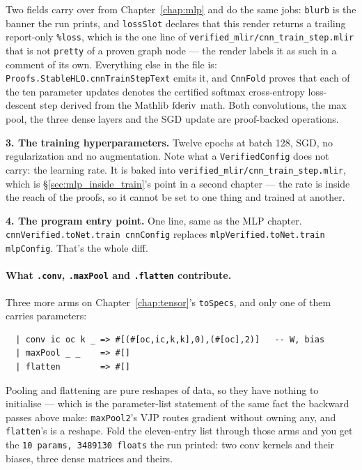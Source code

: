 \noindent Two fields carry over from Chapter~\ref{chap:mlp} and do the same
jobs: \texttt{blurb} is the banner the run prints, and \texttt{lossSlot}
declares that this render returns a trailing report-only \texttt{\%loss},
which is the one line of \texttt{verified\_mlir/cnn\_train\_step.mlir} that
is not \texttt{pretty} of a proven graph node --- the render labels it as
such in a comment of its own. Everything else in the file is:
\texttt{Proofs.StableHLO.cnnTrainStepText} emits it, and
\texttt{CnnFold} proves that each of the ten parameter updates
denotes the certified softmax cross-entropy loss-descent step derived from
the Mathlib \(\operatorname{fderiv}\) math. Both convolutions, the max pool, the three
dense layers and the SGD update are proof-backed operations.

\textbf{3. The training hyperparameters.} Twelve epochs at batch 128,
SGD, no regularization and no augmentation. Note what a
\texttt{VerifiedConfig} does not carry: the learning rate. It is
baked into \texttt{verified\_mlir/cnn\_train\_step.mlir}, which is
\S\ref{sec:mlp_inside_train}'s point in a second chapter --- the rate is
inside the reach of the proofs, so it cannot be set to one thing and
trained at another.

\textbf{4. The program entry point.} One line, same as the MLP
chapter. \texttt{cnnVerified.toNet.train cnnConfig} replaces
\texttt{mlpVerified.toNet.train mlpConfig}. That's the whole diff.

\paragraph{What \texttt{.conv}, \texttt{.maxPool} and \texttt{.flatten}
contribute.} Three more arms on Chapter~\ref{chap:tensor}'s
\texttt{toSpecs}, and only one of them carries parameters:

\begin{verbatim}
  | conv ic oc k _ => #[(#[oc,ic,k,k],0),(#[oc],2)]   -- W, bias
  | maxPool _ _    => #[]
  | flatten        => #[]
\end{verbatim}

\noindent Pooling and flattening are pure reshapes of data, so they have
nothing to initialise --- which is the parameter-list statement of the
same fact the backward passes above make: \texttt{maxPool2}'s VJP routes
gradient without owning any, and \texttt{flatten}'s is a reshape. Fold
the eleven-entry list through those arms and you get the
\texttt{10 params, 3489130 floats} the run printed: two conv kernels and
their biases, three dense matrices and theirs.

